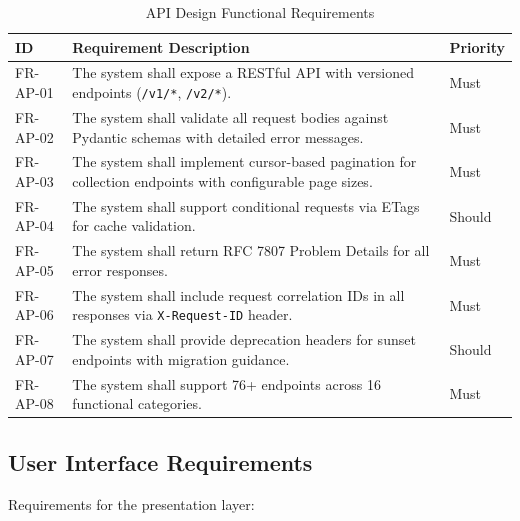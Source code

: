 \begin{table}[htbp]
\centering
\caption{API Design Functional Requirements}
\label{tab:fr-api}
\small
\begin{tabularx}{\textwidth}{|l|X|l|}
\hline
\textbf{ID} & \textbf{Requirement Description} & \textbf{Priority} \\
\hline
FR-AP-01 & The system shall expose a RESTful API with versioned endpoints (\texttt{/v1/*}, \texttt{/v2/*}). & Must \\
\hline
FR-AP-02 & The system shall validate all request bodies against Pydantic schemas with detailed error messages. & Must \\
\hline
FR-AP-03 & The system shall implement cursor-based pagination for collection endpoints with configurable page sizes. & Must \\
\hline
FR-AP-04 & The system shall support conditional requests via ETags for cache validation. & Should \\
\hline
FR-AP-05 & The system shall return RFC 7807 Problem Details for all error responses. & Must \\
\hline
FR-AP-06 & The system shall include request correlation IDs in all responses via \texttt{X-Request-ID} header. & Must \\
\hline
FR-AP-07 & The system shall provide deprecation headers for sunset endpoints with migration guidance. & Should \\
\hline
FR-AP-08 & The system shall support 76+ endpoints across 16 functional categories. & Must \\
\hline
\end{tabularx}
\end{table}

\subsection{User Interface Requirements}
\label{subsec:fr-ui}

Requirements for the presentation layer:

